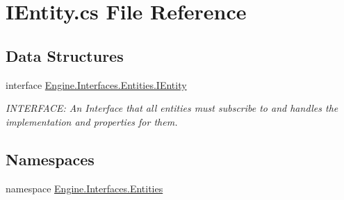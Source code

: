 \hypertarget{a00110}{}\section{I\+Entity.\+cs File Reference}
\label{a00110}
\subsection*{Data Structures}
\begin{DoxyCompactItemize}
\item 
interface \hyperlink{a00438}{Engine.\+Interfaces.\+Entities.\+I\+Entity}
\begin{DoxyCompactList}\small\item\em I\+N\+T\+E\+R\+F\+A\+CE\+: An Interface that all entities must subscribe to and handles the implementation and properties for them. \end{DoxyCompactList}\end{DoxyCompactItemize}
\subsection*{Namespaces}
\begin{DoxyCompactItemize}
\item 
namespace \hyperlink{a00259}{Engine.\+Interfaces.\+Entities}
\end{DoxyCompactItemize}

